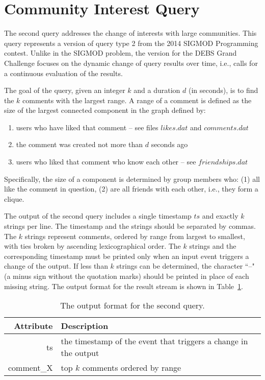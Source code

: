 \documentclass{sig-alternate}
\begin{document}
\section{Community Interest Query}
\label{sec:query2}
The second query addresses the change of interests with large communities. This query represents a version of query type 2 from the 2014 SIGMOD Programming contest. Unlike in the SIGMOD problem, the version for the DEBS Grand Challenge focuses on the dynamic change of query results over time, i.e., calls for a continuous evaluation of the results. 

The goal of the query, given an integer $k$ and a duration $d$ (in seconds), is to find the $k$ comments with the largest range. A range of a comment is defined as the size of the largest connected component in the graph defined by:  
\begin{enumerate}
		\item users who have liked that comment -- see files $likes.dat$ and $comments.dat$
		\item the comment was created not more than $d$ seconds ago
		\item users who liked that comment who know each other -- see $friendships.dat$
\end{enumerate}	
Specifically, the size of a component is determined by group members who: (1) all like the comment in question, (2) are all friends with each other, i.e., they form a clique.

The output of the second query includes a single timestamp $ts$ and exactly $k$ strings per line. The timestamp and the strings should be separated by commas. The $k$ strings represent comments, ordered by range from largest to smallest, with ties broken by ascending lexicographical order. The $k$ strings and the corresponding timestamp must be printed only when an input event triggers a change of the output. If less than $k$ strings can be determined, the character ``--" (a minus sign without the quotation marks) should be printed in place of each missing string. The output format for the result stream is shown in Table~\ref{table:query2}. 

\begin{table}[ht]
	\caption{The output format for the second query.}
	\centering 
	\begin{tabular}{r p{5.2cm}}
		\toprule
		Attribute		&	 Description\\
		\midrule
		ts			&	the timestamp of the event that triggers a change in the output\\[2ex]
		comment\_X	&	top $k$ comments ordered by range\\[2ex]		
		\bottomrule 
	\end{tabular}
	\label{table:query2}
\end{table}
\end{document}
